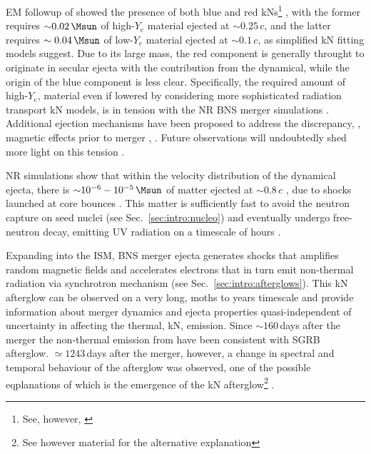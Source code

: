 \ac{EM} followup of \GW{} showed the presence of both blue and red \acp{kN}\footnote{
    See, however, \cite{143}
} \cite{144},
with the former requires ${\sim}0.02\,\Msun$ of high-$Y_e$ material ejected at ${\sim0.25}\,c$,
and the latter requires ${\sim0.04\,\Msun}$ of low-$Y_e$ material ejected at ${\sim0.1}\,c$, 
as simplified \ac{kN} fitting models suggest. Due to its large mass, the red component is 
generally throught to originate in secular ejecta with the contribution from the dynamical, while 
the origin of the blue component is less clear. Specifically, the required amount of high-$Y_e$,
material even if lowered by considering more sophisticated radiation transport \ac{kN} models,
is in tension with the \ac{NR} \ac{BNS} merger simulations \cite{18,Siegel:2019mlp,145,146}.
Additional ejection mechanisms have been proposed to address the discrepancy, \ug, 
magnetic effects prior to merger \cite{77,78,147}, . Future observations will undoubtedly shed 
more light on this tension \cite{77}.

\ac{NR} simulations show that within the velocity distribution of the dynamical ejecta, 
there is ${\sim}10^{-6}-10^{-5}\,\Msun$ of matter ejected at ${\sim}0.8\,c$ 
\cite{148,149,122,147}, due to shocks launched at core bounces \cite{122}.
This matter is sufficiently fast to avoid the neutron capture on seed nuclei 
(see Sec.~\ref{sec:intro:nucleo}) and eventually undergo free-neutron decay, emitting 
\ac{UV} radiation on a timescale of hours \cite{148}. 

Expanding into the \ac{ISM}, \ac{BNS} merger ejecta generates shocks that amplifies 
random magnetic fields and accelerates electrons that in turn emit non-thermal radiation 
via synchrotron mechanism (see Sec.~\ref{sec:intro:afterglows}). This \ac{kN} afterglow 
can be observed on a very long, 
moths to years timescale \cite{150,149} and provide information about merger dynamics and 
ejecta properties quasi-independent of uncertainty in \rproc{} \nuc{} affecting the 
thermal, \ac{kN}, emission. 
Since ${\sim160}\,$days after the merger the non-thermal emission from \GW{} have been 
consistent with \ac{SGRB} afterglow. ${\simeq}1243\,$days after the merger, however, a 
change in spectral and temporal behaviour of the afterglow was observed, one of the 
possible eqplanations of which is the emergence of the \ac{kN} afterglow\footnote{
    See however material \cite{Troja:2021xsw} for the alternative explanation
} \cite{Hajela:2021faz}.





